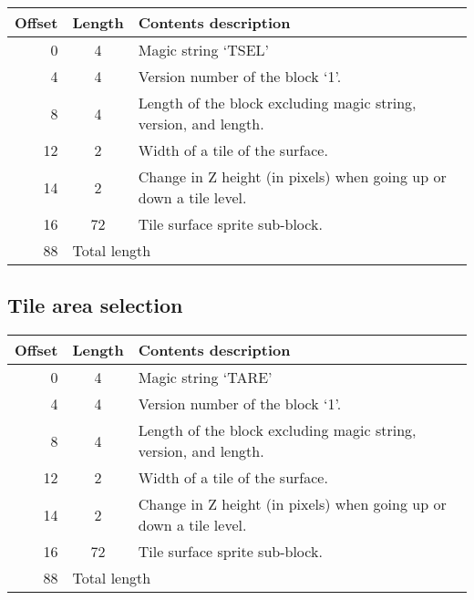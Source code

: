 \documentclass{article}
\begin{document}
\begin{center}
\begin{tabular}{|r|c|l|} \hline
\textbf{Offset} & \textbf{Length} & \textbf{Contents description} \\ \hline
   0 &  4 & Magic string `TSEL' \\
   4 &  4 & Version number of the block `1'. \\
   8 &  4 & Length of the block excluding magic string, version, and length. \\
  12 &  2 & Width of a tile of the surface. \\
  14 &  2 & Change in Z height (in pixels) when going up or down a tile level. \\
  16 & 72 & Tile surface sprite sub-block. \\ \hline
  88 & \multicolumn{2}{l|}{Total length} \\ \hline
\end{tabular}
\end{center}

\subsection{Tile area selection}
\begin{center}
\begin{tabular}{|r|c|l|} \hline
\textbf{Offset} & \textbf{Length} & \textbf{Contents description} \\ \hline
   0 &  4 & Magic string `TARE' \\
   4 &  4 & Version number of the block `1'. \\
   8 &  4 & Length of the block excluding magic string, version, and length. \\
  12 &  2 & Width of a tile of the surface. \\
  14 &  2 & Change in Z height (in pixels) when going up or down a tile level. \\
  16 & 72 & Tile surface sprite sub-block. \\ \hline
  88 & \multicolumn{2}{l|}{Total length} \\ \hline
\end{tabular}
\end{center}
\end{document}
